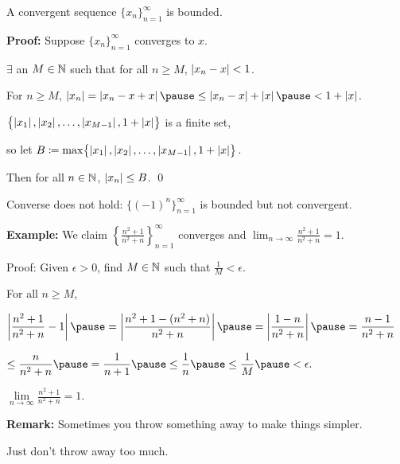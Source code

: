 \documentclass[10pt,aspectratio=149]{beamer}
\begin{document}
\begin{frame}

\begin{proposition}
A convergent sequence $\{ x_n \}_{n=1}^\infty$ is bounded.
\end{proposition}

\pause

\textbf{Proof:}
Suppose $\{ x_n \}_{n=1}^\infty$ converges to $x$.

\pause
\thus \quad $\exists$ an $M \in {\mathbb{N}}$ such that for all $n \geq M$,\quad
$\left\lvert {x_n - x} \right\rvert < 1$.

\medskip
\pause

For $n \geq M$, \quad
$\abs{x_n} = \abs{x_n - x + x} \pause
\leq \abs{x_n - x} + \abs{x} \pause
< 1 + \abs{x}$.

\medskip
\pause

$\bigl\{ \left\lvert {x_1} \right\rvert, \left\lvert {x_2} \right\rvert, \ldots, \left\lvert {x_{M-1}} \right\rvert, 1+\left\lvert {x} \right\rvert \bigr\}$
is a finite set,

so let
\quad $B \coloneqq \max \bigl\{ \left\lvert {x_1} \right\rvert, \left\lvert {x_2} \right\rvert, \ldots, \left\lvert {x_{M-1}} \right\rvert, 1+\left\lvert {x} \right\rvert \bigr\}$.

\medskip
\pause

Then for all $n \in {\mathbb{N}}$, \quad $\left\lvert {x_n} \right\rvert \leq B$.
\qed

\medskip
\pause

Converse does not hold: $\{ {(-1)}^n \}_{n=1}^\infty$ is bounded but not convergent.

\end{frame}

\begin{frame}


\textbf{Example:}
We claim $\left\{ \frac{n^2+1}{n^2+n} \right\}_{n=1}^\infty$ converges and
\quad $\displaystyle \lim_{n\to\infty} \frac{n^2+1}{n^2+n} = 1$.

\medskip
\pause

Proof:
Given $\epsilon > 0$, find $M \in {\mathbb{N}}$ such that $\frac{1}{M} < \epsilon$.

\medskip
\pause

For all $n \geq M$,

\medskip

\qquad
$\displaystyle
\abs{\frac{n^2+1}{n^2+n} - 1}  \pause = \abs{\frac{n^2+1 - (n^2+n)}{n^2+n}}
\pause
=
\abs{\frac{1 - n}{n^2+n}}
\pause
=
\frac{n-1}{n^2+n}
$

\medskip
\pause

\hfill
$\displaystyle
\leq 
\frac{n}{n^2+n} 
\pause
 =
\frac{1}{n+1}
\pause
\leq \frac{1}{n}
\pause
\leq \frac{1}{M}
\pause < \epsilon .
$\qquad

\medskip
\pause

\thus \quad
$\lim\limits_{n\to\infty} \frac{n^2+1}{n^2+n} = 1$.

\medskip
\pause

\textbf{Remark:} Sometimes you throw something away
to make things simpler.

\pause
Just don't throw away too much.

\end{frame}
\end{document}
